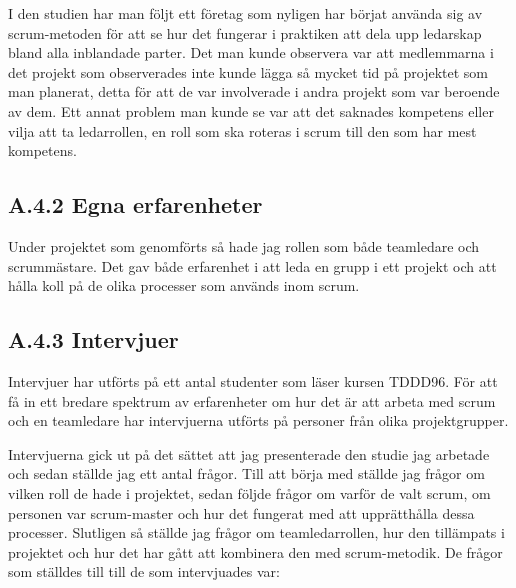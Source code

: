 I den studien har man följt ett företag som nyligen har börjat använda sig av scrum-metoden för att se hur det fungerar i praktiken att dela upp ledarskap bland alla inblandade parter. Det man kunde observera var att medlemmarna i det projekt som observerades inte kunde lägga så mycket tid på projektet som man planerat, detta för att de var involverade i andra projekt som var beroende av dem. Ett annat problem man kunde se var att det saknades kompetens eller vilja att ta ledarrollen, en roll som ska roteras i scrum till den som har mest kompetens. \cite{sharedleader}

\subsection{A.4.2 Egna erfarenheter}
Under projektet som genomförts så hade jag rollen som både teamledare och scrummästare. Det gav både erfarenhet i att leda en grupp i ett projekt och att hålla koll på de olika processer som används inom scrum.

\subsection{A.4.3 Intervjuer}
Intervjuer har utförts på ett antal studenter som läser kursen TDDD96. För att få in ett bredare spektrum av erfarenheter om hur det är att arbeta med scrum och en teamledare har intervjuerna utförts på personer från olika projektgrupper.

Intervjuerna gick ut på det sättet att jag presenterade den studie jag arbetade och sedan ställde jag ett antal frågor. Till att börja med ställde jag frågor om vilken roll de hade i projektet, sedan följde frågor om varför de valt scrum, om personen var scrum-master och hur det fungerat med att upprätthålla dessa processer. Slutligen så ställde jag frågor om teamledarrollen, hur den tillämpats i projektet och hur det har gått att kombinera den med scrum-metodik. De frågor som ställdes till till de som intervjuades var:


